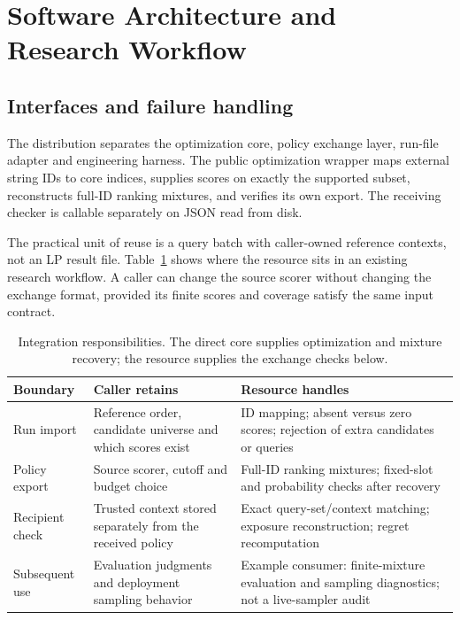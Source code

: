 \documentclass[runningheads]{llncs}
\begin{document}
\section{Software Architecture and Research Workflow}
\label{sec:integration}
\subsection{Interfaces and failure handling}
The distribution separates the optimization core, policy exchange layer,
run-file adapter and engineering harness. The public optimization wrapper maps
external string IDs to core indices, supplies scores on exactly the supported
subset, reconstructs full-ID ranking mixtures, and verifies its own export.
The receiving checker is callable separately on JSON read from disk.

The practical unit of reuse is a query batch with caller-owned reference
contexts, not an LP result file. Table~\ref{tab:integration} shows where the
resource sits in an existing research workflow. A caller can change the source
scorer without changing the exchange format, provided its finite scores and
coverage satisfy the same input contract.

\begin{table}[t]
\caption{Integration responsibilities. The direct core supplies optimization
and mixture recovery; the resource supplies the exchange checks below.}
\label{tab:integration}
\small
\begin{tabular}{p{}p{}p{}}
\toprule
Boundary & Caller retains & Resource handles\\
\midrule
Run import & Reference order, candidate universe and which scores exist &
ID mapping; absent versus zero scores; rejection of extra candidates or queries\\
Policy export & Source scorer, cutoff and budget choice &
Full-ID ranking mixtures; fixed-slot and probability checks after recovery\\
Recipient check & Trusted context stored separately from the received policy &
Exact query-set/context matching; exposure reconstruction; regret recomputation\\
Subsequent use & Evaluation judgments and deployment sampling behavior &
Example consumer: finite-mixture evaluation and sampling diagnostics;
not a live-sampler audit\\
\bottomrule
\end{tabular}
\end{table}
\end{document}
